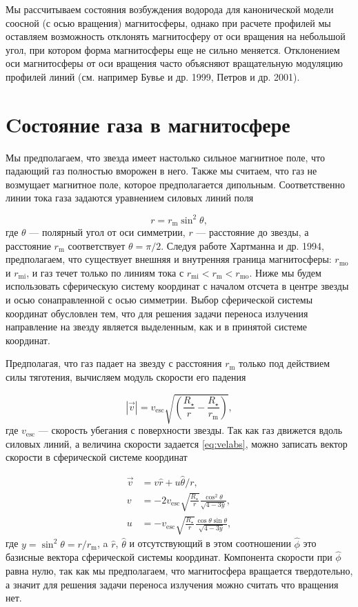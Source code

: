 \documentclass{article}
\begin{document}
Мы рассчитываем состояния возбуждения водорода для канонической модели соосной (с осью вращения) магнитосферы, однако при расчете профилей мы оставляем возможность отклонять магнитосферу от оси вращения на небольшой угол, при котором форма магнитосферы еще не сильно меняется. Отклонением оси магнитосферы от оси вращения часто объясняют вращательную модуляцию профилей линий (см. например Бувье и др. 1999, Петров и др. 2001).

\section{Cостояние газа в магнитосфере}

Мы предполагаем, что звезда имеет настолько сильное магнитное поле, что падающий газ полностью вморожен в него. Также мы считаем, что газ не возмущает магнитное поле, которое предполагается дипольным. Соответственно линии тока газа задаются уравнением силовых линий поля

\begin{equation} \label{eq:dipole}
r = r_\text{m} \sin^2 \theta,
\end{equation}
где $\theta$ --- полярный угол от оси симметрии, $r$ --- расстояние до звезды, а расстояние $r_\text{m}$ соответствует $\theta = \pi/2$. Следуя работе Хартманна и др. 1994, предполагаем, что существует внешняя и внутренняя граница магнитосферы: $r_\text{mo}$ и $r_\text{mi}$, и газ течет только по линиям тока с $r_\text{mi} < r_\text{m} < r_\text{mo}$. Ниже мы будем использовать сферическую систему координат с началом отсчета в центре звезды и осью сонаправленной с осью симметрии. Выбор сферической системы координат обусловлен тем, что для решения задачи переноса излучения направление на звезду является выделенным, как и в принятой системе координат.

Предполагая, что газ падает на звезду с расстояния $r_\text{m}$ только под действием силы тяготения, вычисляем модуль скорости его падения

\begin{equation} \label{eq:velabs}
|\vec{v}| = v_\text{esc}\sqrt{\left(\frac{R_\star}{r} - \frac{R_\star}{r_\text{m}}\right)},
\end{equation}
где $v_\text{esc}$ --- скорость убегания с поверхности звезды. Так как газ движется вдоль силовых линий, а величина скорости задается \eqref{eq:velabs}, можно записать вектор скорости в сферической системе координат

\begin{align} \label{eq:velvec}
 \vec{v} & = v \hat{r} + u \hat{\theta}/r, \\
 v & = -2v_\text{esc}\sqrt{\frac{R_\star}{r}}\frac{\cos^2\theta}{\sqrt{4-3y}}, \nonumber \\
 u & = -v_\text{esc}\sqrt{\frac{R_\star}{r}}\frac{\cos\theta\sin\theta}{\sqrt{4-3y}}, \nonumber
\end{align}
где $y = \sin^2\theta = r/r_\text{m}$, a $\hat{r}$, $\hat{\theta}$ и отсутствующий в этом соотношении $\hat{\phi}$ это базисные вектора сферической системы координат. Компонента скорости при $\hat{\phi}$ равна нулю, так как мы предполагаем, что магнитосфера вращается твердотельно, а значит для решения задачи переноса излучения можно считать что вращения нет.
\end{document}
